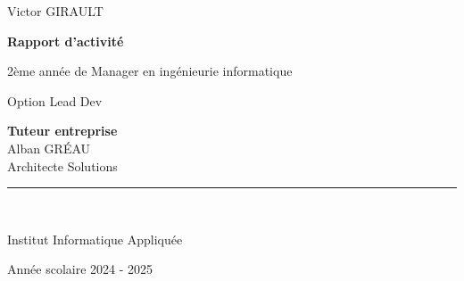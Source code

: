 \documentclass[12pt]{article}
\begin{document}
\begin{titlepage}
  {\Huge Victor GIRAULT\par}
  \vspace*{2cm}
  {\Huge \textbf{Rapport d'activité}}\par
  \vspace{.5cm}
  {\LARGE 2ème année de Manager en ingénieurie informatique}\par
  \vspace{0.4cm}
  {\Large Option Lead Dev}\par
  \vfill
  \begin{center}
    \textbf{Tuteur entreprise\\}
    Alban GRÉAU\\
    Architecte Solutions\\[2.5cm]
    \hspace{2cm}\rule{8cm}{0.5pt}\\
  \end{center}
  \vfill
  \begin{minipage}{0.55\textwidth}
    \raggedright
    {\large Institut Informatique Appliquée\par}
  \end{minipage}
  \hfill
  \begin{minipage}{0.4\textwidth}
    \raggedleft
    {\large Année scolaire 2024 - 2025\par}
  \end{minipage}
\end{titlepage}

\newpage
\tableofcontents
\thispagestyle{empty}
\newpage
\listoffigures
\thispagestyle{empty}
\newpage
\setcounter{page}{1}
\end{document}
